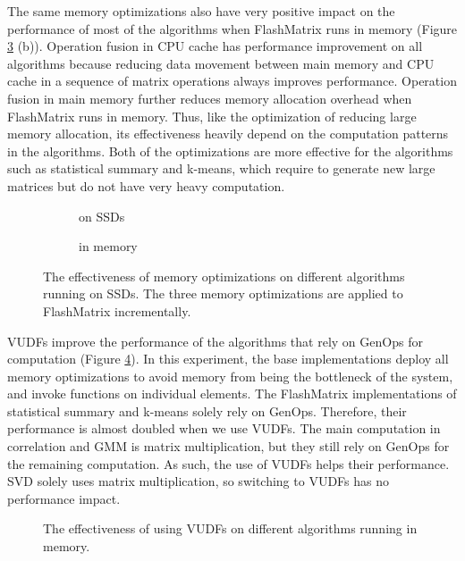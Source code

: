 The same memory optimizations also have very positive impact on the performance
of most of the algorithms when FlashMatrix runs in memory (Figure
\ref{perf:opts} (b)). Operation fusion in CPU cache has performance improvement
on all algorithms because reducing data movement between main memory and CPU
cache in a sequence of matrix operations always improves performance.
Operation fusion in main memory further reduces memory allocation overhead when
FlashMatrix runs in memory. Thus, like the optimization of reducing large
memory allocation, its effectiveness heavily depend on the computation patterns
in the algorithms. Both of the optimizations are more effective for
the algorithms such as statistical summary and k-means, which require to
generate new large matrices but do not have very heavy computation.

\begin{figure}
	\centering
	\footnotesize
	\vspace{-15pt}
	\begin{subfigure}{.5\textwidth}
		
		\label{perf:em_opts}
		\vspace{-15pt}
		\caption{on SSDs}
	\end{subfigure}

	\begin{subfigure}{.5\textwidth}
		
		\label{perf:im_opts}
		\vspace{-15pt}
		\caption{in memory}
	\end{subfigure}
	\caption{The effectiveness of memory optimizations on different
			algorithms running on SSDs. The three memory optimizations are
		applied to FlashMatrix incrementally.}
	\label{perf:opts}
\end{figure}

VUDFs improve the performance of the algorithms that rely on GenOps
for computation (Figure \ref{perf:opts_CPU}). In this experiment, the base
implementations deploy all memory optimizations to avoid memory from being
the bottleneck of the system, and invoke functions on individual elements.
The FlashMatrix implementations of statistical summary and k-means solely
rely on GenOps. Therefore, their performance is almost doubled
when we use VUDFs. The main computation in correlation and GMM is matrix
multiplication, but they still rely on GenOps for the remaining computation.
As such, the use of VUDFs helps their performance. SVD solely uses matrix
multiplication, so switching to VUDFs has no performance impact.

\begin{figure}
	\begin{center}
		\footnotesize
		\vspace{-15pt}
		
		\vspace{-10pt}
		\caption{The effectiveness of using VUDFs on different algorithms
		running in memory.}
		\label{perf:opts_CPU}
	\end{center}
\end{figure}
